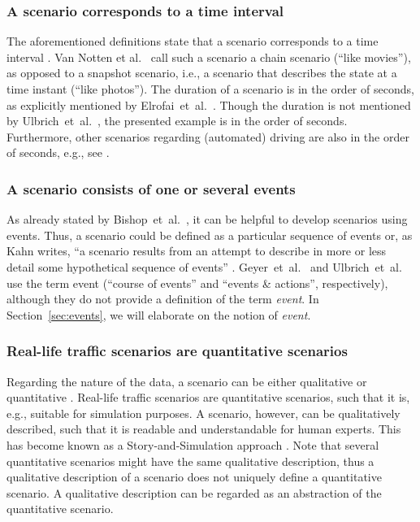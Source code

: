 \subsubsection{A scenario corresponds to a time interval}
The aforementioned definitions state that a scenario corresponds to a time interval \cite{go2004blind, geyer2014, ulbrich2015, elrofai2016scenario}. Van Notten et al.\ \cite{vannotten2003updated} call such a scenario a chain scenario (``like movies''), as opposed to a snapshot scenario, i.e., a scenario that describes the state at a time instant (``like photos''). The duration of a scenario is in the order of seconds, as explicitly mentioned by Elrofai~et~al.~\cite{elrofai2016scenario}. Though the duration is not mentioned by Ulbrich~et~al.~\cite{ulbrich2015}, the presented example is in the order of seconds. Furthermore, other scenarios regarding (automated) driving are also in the order of seconds, e.g., see \cite{gietelink2006development, zofka2015datadrivetrafficscenarios, roesener2017comprehensive, karaduman2013interactivebehavior, hulshof2013autonomous, englund2016grand}.

\subsubsection{A scenario consists of one or several events \cite{vannotten2003updated, go2004blind, geyer2014, ulbrich2015, kahn1962, englund2016grand, schoemaker1993multiple, cuppens2002alert, bach2016modelbased}}
As already stated by Bishop~et~al.~\cite{bishop2007scentechniques}, it can be helpful to develop scenarios using events. Thus, a scenario could be defined as a particular sequence of events or, as Kahn writes, ``a scenario results from an attempt to describe in more or less detail some hypothetical sequence of events'' \cite{kahn1962}. Geyer~et~al.~\cite{geyer2014} and Ulbrich~et~al.~\cite{ulbrich2015} use the term event (``course of events'' and ``events \& actions'', respectively), although they do not provide a definition of the term \emph{event}. In Section~\ref{sec:events}, we will elaborate on the notion of \emph{event}.

\subsubsection{Real-life traffic scenarios are quantitative scenarios}
Regarding the nature of the data, a scenario can be either qualitative or quantitative \cite{vannotten2003updated}. Real-life traffic scenarios are quantitative scenarios, such that it is, e.g., suitable for simulation purposes. A scenario, however, can be qualitatively described, such that it is readable and understandable for human experts. This has become known as a Story-and-Simulation approach \cite{alcamo2001scenarios}. Note that several quantitative scenarios might have the same qualitative description, thus a qualitative description of a scenario does not uniquely define a quantitative scenario. A qualitative description can be regarded as an abstraction of the quantitative scenario.
	
